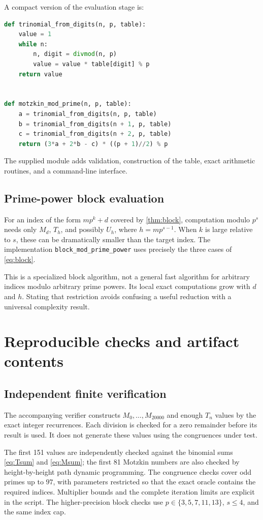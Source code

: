\documentclass[11pt,a4paper]{article}
\numberwithin{equation}{section}
\theoremstyle{definition}
\theoremstyle{remark}
\begin{document}
A compact version of the evaluation stage is:
\begin{lstlisting}[language=Python]
def trinomial_from_digits(n, p, table):
    value = 1
    while n:
        n, digit = divmod(n, p)
        value = value * table[digit] % p
    return value


def motzkin_mod_prime(n, p, table):
    a = trinomial_from_digits(n, p, table)
    b = trinomial_from_digits(n + 1, p, table)
    c = trinomial_from_digits(n + 2, p, table)
    return (3*a + 2*b - c) * ((p + 1)//2) % p
\end{lstlisting}
The supplied module adds validation, construction of the table, exact
arithmetic routines, and a command-line interface.

\subsection{Prime-power block evaluation}
For an index of the form $mp^k+d$ covered by \cref{thm:block}, computation
modulo $p^s$ needs only $M_d$, $T_h$, and possibly $U_h$, where
$h=mp^{s-1}$. When $k$ is large relative to $s$, these can be dramatically
smaller than the target index. The implementation
\texttt{block\_mod\_prime\_power} uses precisely the three cases of
\eqref{eq:block}.

This is a specialized block algorithm, not a general fast algorithm for
arbitrary indices modulo arbitrary prime powers. Its local exact
computations grow with $d$ and $h$. Stating that restriction avoids
confusing a useful reduction with a universal complexity result.

\section{Reproducible checks and artifact contents}\label{sec:verification}

\subsection{Independent finite verification}
The accompanying verifier constructs $M_0,\ldots,M_{20000}$ and enough
$T_n$ values by the exact integer recurrences. Each division is checked
for a zero remainder before its result is used. It does not generate
these values using the congruences under test.

The first 151 values are independently checked against the binomial
sums \eqref{eq:Tsum} and \eqref{eq:Msum}; the first 81 Motzkin numbers
are also checked by height-by-height path dynamic programming. The
congruence checks cover odd primes up to $97$, with parameters restricted
so that the exact oracle contains the required indices. Multiplier
bounds and the complete iteration limits are explicit in the script.
The higher-precision block checks use $p\in\{3,5,7,11,13\}$,
$s\leq4$, and the same index cap.
\end{document}
